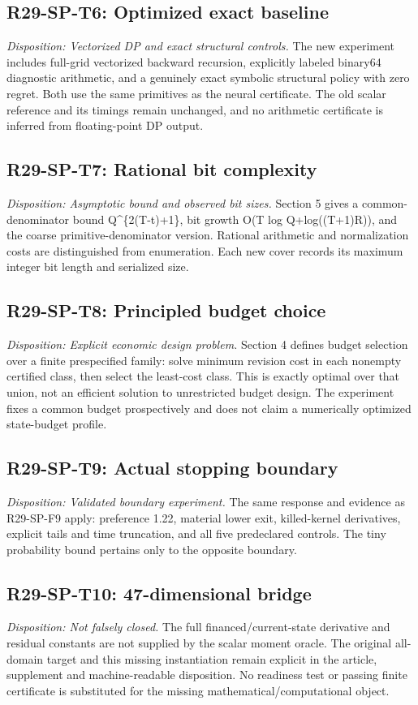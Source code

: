 \subsection{R29-SP-T6: Optimized exact baseline}
\textit{Disposition: Vectorized DP and exact structural controls.} The new experiment includes full-grid vectorized backward recursion, explicitly labeled binary64 diagnostic arithmetic, and a genuinely exact symbolic structural policy with zero regret. Both use the same primitives as the neural certificate. The old scalar reference and its timings remain unchanged, and no arithmetic certificate is inferred from floating-point DP output.
\subsection{R29-SP-T7: Rational bit complexity}
\textit{Disposition: Asymptotic bound and observed bit sizes.} Section 5 gives a common-denominator bound Q\textasciicircum{}\{2(T-t)+1\}, bit growth O(T log Q+log((T+1)R)), and the coarse primitive-denominator version. Rational arithmetic and normalization costs are distinguished from enumeration. Each new cover records its maximum integer bit length and serialized size.
\subsection{R29-SP-T8: Principled budget choice}
\textit{Disposition: Explicit economic design problem.} Section 4 defines budget selection over a finite prespecified family: solve minimum revision cost in each nonempty certified class, then select the least-cost class. This is exactly optimal over that union, not an efficient solution to unrestricted budget design. The experiment fixes a common budget prospectively and does not claim a numerically optimized state-budget profile.
\subsection{R29-SP-T9: Actual stopping boundary}
\textit{Disposition: Validated boundary experiment.} The same response and evidence as R29-SP-F9 apply: preference 1.22, material lower exit, killed-kernel derivatives, explicit tails and time truncation, and all five predeclared controls. The tiny probability bound pertains only to the opposite boundary.
\subsection{R29-SP-T10: 47-dimensional bridge}
\textit{Disposition: Not falsely closed.} The full financed/current-state derivative and residual constants are not supplied by the scalar moment oracle. The original all-domain target and this missing instantiation remain explicit in the article, supplement and machine-readable disposition. No readiness test or passing finite certificate is substituted for the missing mathematical/computational object.
